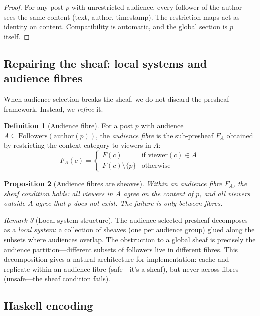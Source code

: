 \documentclass[11pt,a4paper]{article}
\theoremstyle{definition}
\newtheorem{definition}{Definition}[section]
\theoremstyle{plain}
\newtheorem{proposition}[definition]{Proposition}
\theoremstyle{remark}
\newtheorem{remark}[definition]{Remark}
\newcommand{\viewer}{\mathrm{viewer}}
\begin{document}
\begin{proof}
For any post $p$ with unrestricted audience, every follower of the
author sees the same content (text, author, timestamp). The
restriction maps act as identity on content. Compatibility is
automatic, and the global section is $p$ itself.
\end{proof}

\subsection{Repairing the sheaf: local systems and audience fibres}

When audience selection breaks the sheaf, we do not discard the
presheaf framework. Instead, we \emph{refine} it.

\begin{definition}[Audience fibre]\label{def:audience-fibre}
For a post $p$ with audience $A \subseteq \mathrm{Followers}(\mathrm{author}(p))$,
the \emph{audience fibre} is the sub-presheaf $F_A$ obtained by
restricting the context category to viewers in $A$:
\[
  F_A(c) = \begin{cases}
    F(c) & \text{if } \viewer(c) \in A \\
    F(c) \setminus \{p\} & \text{otherwise}
  \end{cases}
\]
\end{definition}

\begin{proposition}[Audience fibres are sheaves]\label{prop:fibre-sheaf}
Within an audience fibre $F_A$, the sheaf condition holds: all
viewers in $A$ agree on the content of $p$, and all viewers outside
$A$ agree that $p$ does not exist. The failure is only
\emph{between} fibres.
\end{proposition}

\begin{remark}[Local system structure]
The audience-selected presheaf decomposes as a \emph{local system}:
a collection of sheaves (one per audience group) glued along the
subsets where audiences overlap. The obstruction to a global sheaf
is precisely the audience partition---different subsets of followers
live in different fibres. This decomposition gives a natural
architecture for implementation: cache and replicate within an
audience fibre (safe---it's a sheaf), but never across fibres
(unsafe---the sheaf condition fails).
\end{remark}

\subsection{Haskell encoding}
\end{document}
